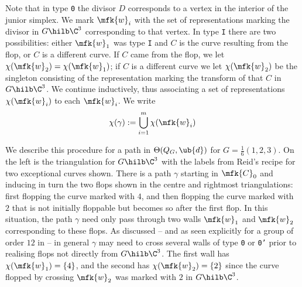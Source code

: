 \documentclass[leqno,11pt,a4paper]{amsart}
\begin{document}
Note that in type \texttt{0} the divisor $D$ corresponds to a vertex in the interior of the junior simplex. We mark $\mfk{w}_i$ with the set of representations marking the divisor in $G\hilb\C^3$ corresponding to that vertex. In type \texttt{I} there are two possibilities: either $\mfk{w}_1$ was type \texttt{I} and $C$ is the curve resulting from the flop, or $C$ is a different curve. If $C$ came from the flop, we let $\chi(\mfk{w}_2)=\chi(\mfk{w}_1)$; if $C$ is a different curve we let $\chi(\mfk{w}_2)$ be the singleton consisting of the representation marking the transform of that $C$ in $G\hilb\C^3$. We continue inductively, thus associating a set of representations $\chi(\mfk{w}_i)$ to each $\mfk{w}_i$. We write
$$\chi(\gamma):=\bigcup_{i=1}^m\chi(\mfk{w}_i)$$

\begin{example} \label{ex:16_wall} We describe this procedure for a path in $\Theta(Q_G,\ub{d})$ for $G=\frac{1}{6}(1,2,3)$. On the left is the triangulation for $G\hilb\C^3$ with the labels from Reid's recipe for two exceptional curves shown. There is a path $\gamma$ starting in $\mfk{C}_0$ and inducing in turn the two flops shown in the centre and rightmost triangulations: first flopping the curve marked with $4$, and then flopping the curve marked with $2$ that is not initially floppable but becomes so after the first flop. In this situation, the path $\gamma$ need only pass through two walls $\mfk{w}_1$ and $\mfk{w}_2$ corresponding to these flops. As discussed -- and as seen explicitly for a group of order $12$ in \cite[Ex.~9.13]{ci_flo_04} -- in general $\gamma$ may need to cross several walls of type \texttt{0} or \texttt{0'} prior to realising flops not directly from $G\hilb\C^3$. The first wall has $\chi(\mfk{w}_1)=\{4\}$, and the second has $\chi(\mfk{w}_2)=\{2\}$ since the curve flopped by crossing $\mfk{w}_2$ was marked with $2$ in $G\hilb\C^3$.

\begin{figure}[h]
\begin{center}
\end{center}
\end{figure}
\end{example}
\end{document}
